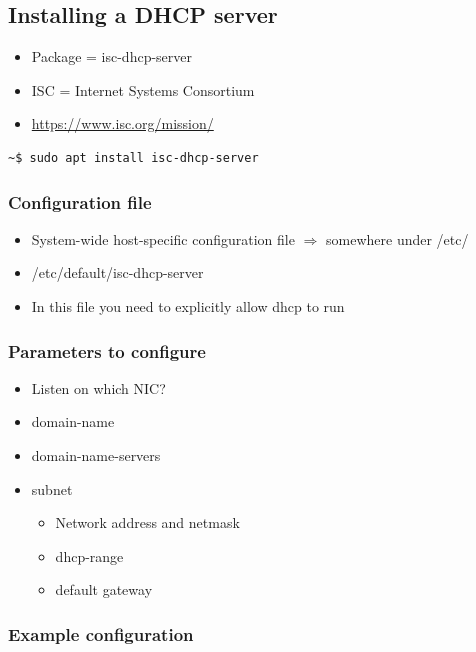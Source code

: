 \documentclass{article}
\begin{document}
\subsection{Installing a DHCP server}

\begin{itemize}
    \item Package = isc-dhcp-server
    \item ISC = Internet Systems Consortium 
    \item \url{https://www.isc.org/mission/}
\end{itemize}

\begin{verbatim}
~$ sudo apt install isc-dhcp-server
\end{verbatim}

\subsubsection{Configuration file}

\begin{itemize}
    \item System-wide host-specific configuration file $\Rightarrow$ somewhere under /etc/
    \item /etc/default/isc-dhcp-server
    \item In this file you need to explicitly allow dhcp to run
\end{itemize}

\subsubsection{Parameters to configure}

\begin{itemize}
    \item Listen on which NIC?
    \item domain-name
    \item domain-name-servers
    \item subnet
    \begin{itemize}
        \item Network address and netmask
        \item dhcp-range
        \item default gateway
    \end{itemize}
\end{itemize}

\subsubsection{Example configuration}
\end{document}
